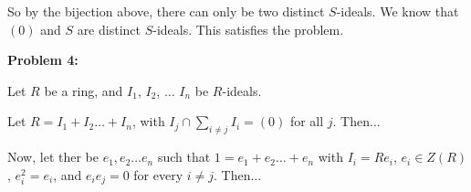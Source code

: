 \documentclass[a4paper,12pt]{article}
\newcommand{\shunt}{\vspace{20mm}}
\begin{document}
So by the bijection above, there can only be two distinct $S$-ideals. We know that $(0)$ and $S$ are distinct $S$-ideals. This satisfies the problem.

\shunt

{\bf Problem 4:}

Let $R$ be a ring, and $I_1$, $I_2$, $\ldots$ $I_n$ be $R$-ideals.

Let $R=I_1 + I_2 \ldots +I_n$, with $I_j \cap \sum\limits_{i \neq j} I_i = (0)$ for all $j$. Then...

Now, let ther be $e_1, e_2 \ldots e_n$ such that $1 = e_1 + e_2 \ldots +e_n$ with $I_i = Re_i$, $e_i \in Z(R)$, $e_i^2 = e_i$, and $e_ie_j = 0$ for every $i \neq j$. Then...

\shunt
\end{document}
